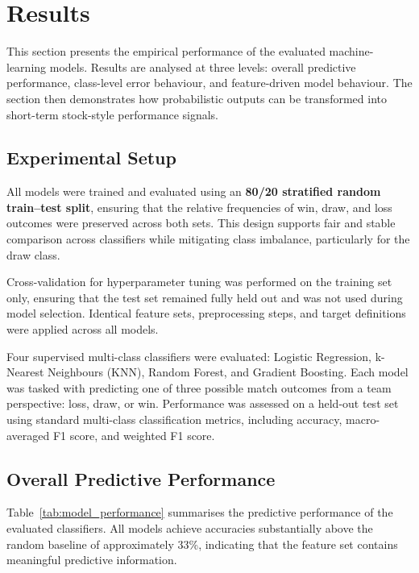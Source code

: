 \documentclass[11pt,a4paper]{article}
\begin{document}
\section{Results}
\label{sec:results}

This section presents the empirical performance of the evaluated machine-learning models. Results are analysed at three levels: overall predictive performance, class-level error behaviour, and feature-driven model behaviour. The section then demonstrates how probabilistic outputs can be transformed into short-term stock-style performance signals.

\subsection{Experimental Setup}

All models were trained and evaluated using an \textbf{80/20 stratified random train–test split}, ensuring that the relative frequencies of win, draw, and loss outcomes were preserved across both sets. This design supports fair and stable comparison across classifiers while mitigating class imbalance, particularly for the draw class.

Cross-validation for hyperparameter tuning was performed on the training set only, ensuring that the test set remained fully held out and was not used during model selection. Identical feature sets, preprocessing steps, and target definitions were applied across all models.

Four supervised multi-class classifiers were evaluated: Logistic Regression, k-Nearest Neighbours (KNN), Random Forest, and Gradient Boosting. Each model was tasked with predicting one of three possible match outcomes from a team perspective: loss, draw, or win. Performance was assessed on a held-out test set using standard multi-class classification metrics, including accuracy, macro-averaged F1 score, and weighted F1 score.


\subsection{Overall Predictive Performance}

Table~\ref{tab:model_performance} summarises the predictive performance of the evaluated classifiers. All models achieve accuracies substantially above the random baseline of approximately 33\%, indicating that the feature set contains meaningful predictive information.
\end{document}
